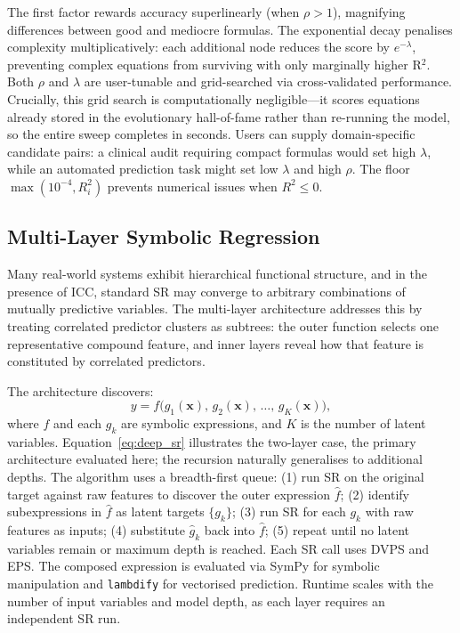 \documentclass[10pt,twocolumn]{article}
\begin{document}
The first factor rewards accuracy superlinearly (when $\rho > 1$), magnifying
differences between good and mediocre formulas.  The exponential decay penalises
complexity multiplicatively: each additional node reduces the score by
$e^{-\lambda}$, preventing complex equations from surviving with only marginally
higher R$^2$.  Both $\rho$ and $\lambda$ are user-tunable and grid-searched
via cross-validated performance.  Crucially, this grid search is computationally
negligible—it scores equations already stored in the evolutionary hall-of-fame
rather than re-running the model, so the entire sweep completes in seconds.
Users can supply domain-specific candidate pairs: a clinical audit requiring
compact formulas would set high $\lambda$, while an automated prediction task
might set low $\lambda$ and high $\rho$.  The floor $\max(10^{-4}, R^2_i)$
prevents numerical issues when $R^2 \leq 0$.

\subsection{Multi-Layer Symbolic Regression}
\label{sec:deepsr}

Many real-world systems exhibit hierarchical functional structure, and in the
presence of ICC, standard SR may converge to arbitrary combinations of mutually
predictive variables.  The multi-layer architecture addresses this by treating
correlated predictor clusters as subtrees: the outer function selects one
representative compound feature, and inner layers reveal how that feature is
constituted by correlated predictors.

The architecture discovers:
\begin{equation}
  y = f\!\bigl(g_1(\mathbf{x}),\, g_2(\mathbf{x}),\, \ldots,\, g_K(\mathbf{x})\bigr),
  \label{eq:deep_sr}
\end{equation}
where $f$ and each $g_k$ are symbolic expressions, and $K$ is the number of
latent variables.  Equation~\ref{eq:deep_sr} illustrates the two-layer case,
the primary architecture evaluated here; the recursion naturally generalises to
additional depths.  The algorithm uses a breadth-first queue: (1) run SR on the
original target against raw features to discover the outer expression $\hat{f}$;
(2) identify subexpressions in $\hat{f}$ as latent targets $\{g_k\}$; (3) run
SR for each $g_k$ with raw features as inputs; (4) substitute $\hat{g}_k$
back into $\hat{f}$; (5) repeat until no latent variables remain or maximum
depth is reached.  Each SR call uses DVPS and EPS.  The composed expression
is evaluated via SymPy for symbolic manipulation and \texttt{lambdify} for
vectorised prediction.  Runtime scales with the number of input variables
and model depth, as each layer requires an independent SR run.
\end{document}
